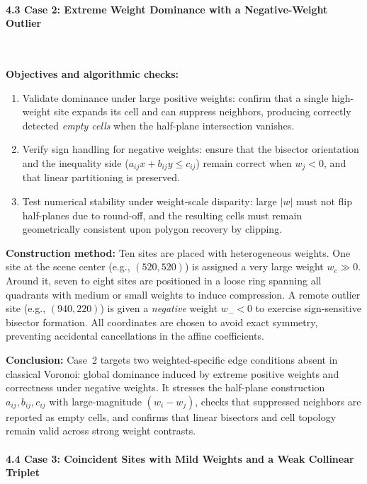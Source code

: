 \documentclass{article}
\begin{document}
\paragraph{4.3 Case 2: Extreme Weight Dominance with a Negative-Weight Outlier}\

\textbf{Objectives and algorithmic checks:}
\begin{enumerate}
    \item Validate dominance under large positive weights: confirm that a single high-weight site expands its cell and can suppress neighbors, producing correctly detected \emph{empty cells} when the half-plane intersection vanishes.
    \item Verify sign handling for negative weights: ensure that the bisector orientation and the inequality side ($a_{ij}x+b_{ij}y\le c_{ij}$) remain correct when $w_j<0$, and that linear partitioning is preserved.
    \item Test numerical stability under weight-scale disparity: large $|w|$ must not flip half-planes due to round-off, and the resulting cells must remain geometrically consistent upon polygon recovery by clipping.
\end{enumerate}

\textbf{Construction method:}
Ten sites are placed with heterogeneous weights. One site at the scene center (e.g., $(520,520)$) is assigned a very large weight $w_c\!\gg\!0$. Around it, seven to eight sites are positioned in a loose ring spanning all quadrants with medium or small weights to induce compression. A remote outlier site (e.g., $(940,220)$) is given a \emph{negative} weight $w_{-}\!<\!0$ to exercise sign-sensitive bisector formation. All coordinates are chosen to avoid exact symmetry, preventing accidental cancellations in the affine coefficients.

\textbf{Conclusion:}
Case~2 targets two weighted-specific edge conditions absent in classical Voronoi: global dominance induced by extreme positive weights and correctness under negative weights. It stresses the half-plane construction $a_{ij},b_{ij},c_{ij}$ with large-magnitude $(w_i-w_j)$, checks that suppressed neighbors are reported as empty cells, and confirms that linear bisectors and cell topology remain valid across strong weight contrasts.

\paragraph{4.4 Case 3: Coincident Sites with Mild Weights and a Weak Collinear Triplet}\
\end{document}
